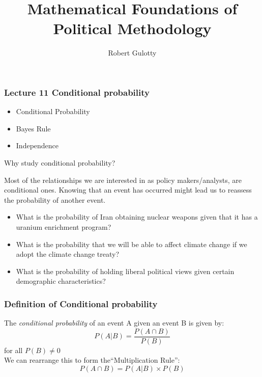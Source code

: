 \documentclass[aspectratio=169]{beamer}
\title[PLSC 43401]{Mathematical Foundations of Political Methodology}
\author{Robert Gulotty}
\institute[Chicago]{University of Chicago}
\numberwithin{equation}{section}
\begin{document}
\begin{frame}
\maketitle
\end{frame}

\begin{frame}
\frametitle{Lecture 11 Conditional probability}

\begin{itemize}
\item Conditional Probability
\item Bayes Rule
\item Independence
\end{itemize}
\end{frame}

\begin{frame}{Why study conditional probability?}

Most of the relationships we are interested in as policy makers/analysts, are conditional ones. Knowing that an event has occurred might lead us to reassess the probability of another event.\pause

\begin{itemize}
\item What is the probability of Iran obtaining nuclear weapons given that it has a uranium enrichment program?\pause
\item What is the probability that we will be able to affect climate change if we adopt the climate change treaty?\pause
\item What is the probability of holding liberal political views given certain demographic characteristics?
\end{itemize}
\end{frame}

\begin{frame}
\frametitle{Definition of Conditional probability}
The \emph{conditional probability} of an event A given an event B is given by:
$$P(A|B)=\frac{P(A\cap B)}{P(B)}$$
for all $P(B)\neq 0$\\
\pause We can rearrange this to form the``Multiplication Rule'':
$$P(A\cap B)=P(A|B)\times P(B)$$

\end{frame}
\end{document}
